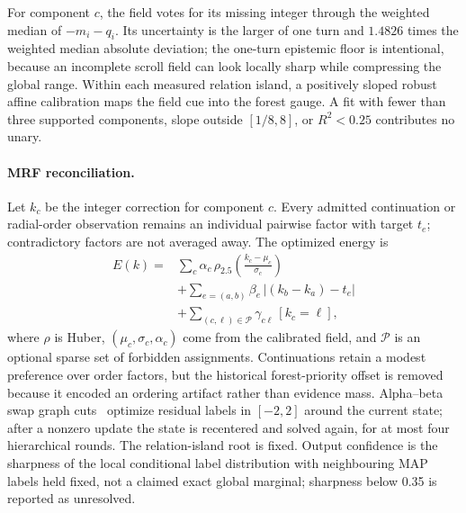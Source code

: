 For component $c$, the field votes for its missing integer through the weighted median of $-m_i-q_i$. Its uncertainty is the larger of one turn and $1.4826$ times the weighted median absolute deviation; the one-turn epistemic floor is intentional, because an incomplete scroll field can look locally sharp while compressing the global range. Within each measured relation island, a positively sloped robust affine calibration maps the field cue into the forest gauge. A fit with fewer than three supported components, slope outside $[1/8,8]$, or $R^2<0.25$ contributes no unary.

\paragraph{MRF reconciliation.} Let $k_c$ be the integer correction for component $c$. Every admitted continuation or radial-order observation remains an individual pairwise factor with target $t_e$; contradictory factors are not averaged away. The optimized energy is
\begin{equation}
  \begin{aligned}
  E(k)={}&\sum_c \alpha_c\,\rho_{2.5}\!\left(\frac{k_c-\mu_c}{\sigma_c}\right)\\
       &+\sum_{e=(a,b)}\beta_e\,\left|(k_b-k_a)-t_e\right|\\
       &+\sum_{(c,\ell)\in\mathcal P}\gamma_{c\ell}\,[k_c=\ell],
  \end{aligned}
  \label{eq:winding-mrf}
\end{equation}
where $\rho$ is Huber, $(\mu_c,\sigma_c,\alpha_c)$ come from the calibrated field, and $\mathcal P$ is an optional sparse set of forbidden assignments. Continuations retain a modest preference over order factors, but the historical forest-priority offset is removed because it encoded an ordering artifact rather than evidence mass. Alpha--beta swap graph cuts~\cite{boykov2001fast} optimize residual labels in $[-2,2]$ around the current state; after a nonzero update the state is recentered and solved again, for at most four hierarchical rounds. The relation-island root is fixed. Output confidence is the sharpness of the local conditional label distribution with neighbouring MAP labels held fixed, not a claimed exact global marginal; sharpness below 0.35 is reported as unresolved.

